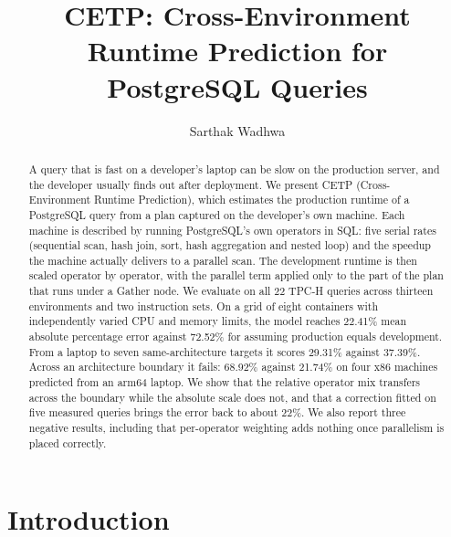\documentclass[runningheads]{llncs}
\begin{document}
\title{CETP: Cross-Environment Runtime Prediction for PostgreSQL Queries}


\author{Sarthak Wadhwa}



\maketitle

\begin{abstract}
A query that is fast on a developer's laptop can be slow on the production
server, and the developer usually finds out after deployment. We present CETP
(Cross-Environment Runtime Prediction), which estimates the production runtime
of a PostgreSQL query from a plan captured on the developer's own machine.
Each machine is described by running PostgreSQL's own operators in SQL: five
serial rates (sequential scan, hash join, sort, hash aggregation and nested
loop) and the speedup the machine actually delivers to a parallel scan. The
development runtime is then scaled operator by operator, with the parallel
term applied only to the part of the plan that runs under a Gather node. We
evaluate on all 22 TPC-H queries across thirteen environments and two
instruction sets. On a grid of eight containers with independently varied CPU
and memory limits, the model reaches 22.41\% mean absolute percentage error
against 72.52\% for assuming production equals development. From a laptop to
seven same-architecture targets it scores 29.31\% against 37.39\%. Across an
architecture boundary it fails: 68.92\% against 21.74\% on four x86 machines
predicted from an arm64 laptop. We show that the relative operator mix
transfers across the boundary while the absolute scale does not, and that a
correction fitted on five measured queries brings the error back to about
22\%. We also report three negative results, including that per-operator
weighting adds nothing once parallelism is placed correctly.

\end{abstract}

\section{Introduction}
\end{document}

